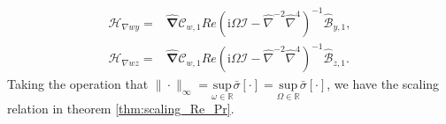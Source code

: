\begin{myproof}
\begin{subequations}
\begin{align}
    \mathcal{H}_{\nabla wy}=&\widehat{\boldsymbol{\nabla}}\widehat{\mathcal{C}}_{w,1}Re\left(\text{i}\Omega \mathcal{I}-\widehat{{\nabla}}^{-2}\widehat{{\nabla}}^{4}\right)^{-1} \widehat{\mathcal{B}}_{y,1},\\
    \mathcal{H}_{\nabla wz}=&\widehat{\boldsymbol{\nabla}}\widehat{\mathcal{C}}_{w,1}Re\left(\text{i}\Omega \mathcal{I}-\widehat{{\nabla}}^{-2}\widehat{{\nabla}}^{4}\right)^{-1} \widehat{\mathcal{B}}_{z,1}. 
\end{align}
\end{subequations}
\endgroup
Taking the operation that $\|\cdot\|_{\infty}=\underset{\omega\in\mathbb{R}}{\text{sup}}\bar{\sigma}[\cdot]=\underset{\Omega\in\mathbb{R}}{\text{sup}}\bar{\sigma}[\cdot]$, we have the scaling relation in theorem \ref{thm:scaling_Re_Pr}. 
\end{myproof}